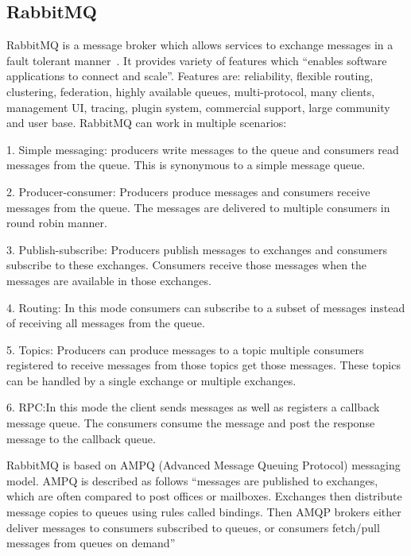 \subsection{RabbitMQ }

RabbitMQ is a message broker which allows services to exchange
messages in a fault tolerant manner~\cite{www-rabbitmq}.  It provides
variety of features which ``enables software applications to connect
and scale''. Features are: reliability, flexible routing, clustering,
federation, highly available queues, multi-protocol, many clients,
management UI, tracing, plugin system, commercial support, large
community and user base. RabbitMQ can work in multiple scenarios:

     1. Simple messaging: producers write messages to the queue and
        consumers read messages from the queue. This is synonymous
        to a simple message queue.

     2. Producer-consumer: Producers produce messages and consumers
        receive messages from the queue. The messages are delivered to
        multiple consumers in round robin manner.

     3. Publish-subscribe: Producers publish messages to exchanges
        and consumers subscribe to these exchanges. Consumers receive
        those messages when the messages are available in those
        exchanges.

     4. Routing: In this mode consumers can subscribe to a subset
        of messages instead of receiving all messages from the queue.

     5. Topics: Producers can produce messages to a topic multiple
        consumers registered to receive messages from those topics get
        those messages. These topics can be handled by a single
        exchange or multiple exchanges.

     6. RPC:In this mode the client sends messages as well as
        registers a callback message queue. The consumers consume the
        message and post the response message to the callback queue.

        RabbitMQ is based on AMPQ (Advanced
        Message Queuing Protocol) messaging model\cite{ampq-article}.
        AMPQ is described
        as follows ``messages are published to exchanges, which are
        often compared to post offices or mailboxes. Exchanges then
        distribute message copies to queues using rules called
        bindings. Then AMQP brokers either deliver messages to
        consumers subscribed to queues, or consumers fetch/pull
        messages from queues on demand''

